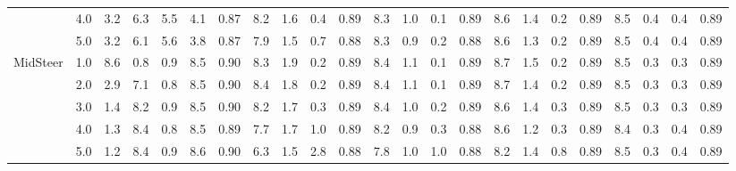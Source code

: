 \begin{table}
{\begin{tabular}{lc|cc|ccc|cccc|cccc|cccc|cccc}
 & 4.0 & 3.2 & 6.3 & 5.5 & 4.1 & 0.87 & 8.2 & 1.6 & 0.4 & 0.89 & 8.3 & 1.0 & 0.1 & 0.89 & 8.6 & 1.4 & 0.2 & 0.89 & 8.5 & 0.4 & 0.4 & 0.89 \\
 & 5.0 & 3.2 & 6.1 & 5.6 & 3.8 & 0.87 & 7.9 & 1.5 & 0.7 & 0.88 & 8.3 & 0.9 & 0.2 & 0.88 & 8.6 & 1.3 & 0.2 & 0.89 & 8.5 & 0.4 & 0.4 & 0.89 \\
\cline{1-23}
\multirow{5}{*}{MidSteer} & 1.0 & 8.6 & 0.8 & 0.9 & 8.5 & 0.90 & 8.3 & 1.9 & 0.2 & 0.89 & 8.4 & 1.1 & 0.1 & 0.89 & 8.7 & 1.5 & 0.2 & 0.89 & 8.5 & 0.3 & 0.3 & 0.89 \\
 & 2.0 & 2.9 & 7.1 & 0.8 & 8.5 & 0.90 & 8.4 & 1.8 & 0.2 & 0.89 & 8.4 & 1.1 & 0.1 & 0.89 & 8.7 & 1.4 & 0.2 & 0.89 & 8.5 & 0.3 & 0.3 & 0.89 \\
 & 3.0 & 1.4 & 8.2 & 0.9 & 8.5 & 0.90 & 8.2 & 1.7 & 0.3 & 0.89 & 8.4 & 1.0 & 0.2 & 0.89 & 8.6 & 1.4 & 0.3 & 0.89 & 8.5 & 0.3 & 0.3 & 0.89 \\
 & 4.0 & 1.3 & 8.4 & 0.8 & 8.5 & 0.89 & 7.7 & 1.7 & 1.0 & 0.89 & 8.2 & 0.9 & 0.3 & 0.88 & 8.6 & 1.2 & 0.3 & 0.89 & 8.4 & 0.3 & 0.4 & 0.89 \\
 & 5.0 & 1.2 & 8.4 & 0.9 & 8.6 & 0.90 & 6.3 & 1.5 & 2.8 & 0.88 & 7.8 & 1.0 & 1.0 & 0.88 & 8.2 & 1.4 & 0.8 & 0.89 & 8.5 & 0.3 & 0.4 & 0.89 \\
\bottomrule
\end{tabular}}
\end{table}
